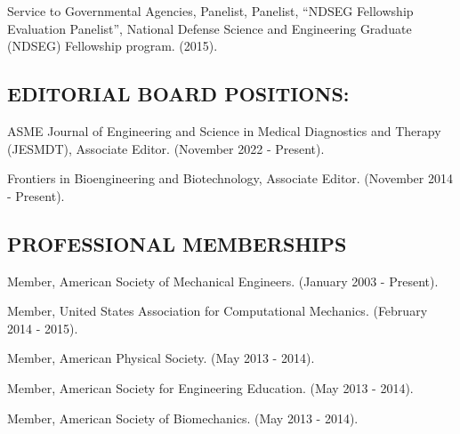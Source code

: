 \documentclass[11pt]{article}
\begin{document}
Service to Governmental Agencies, Panelist, Panelist, ``NDSEG
Fellowship Evaluation Panelist'', National Defense Science and
Engineering Graduate (NDSEG) Fellowship program. 
(2015).

\subsection{EDITORIAL BOARD POSITIONS:}\label{editorial-board-positions}

ASME Journal of Engineering and Science in Medical Diagnostics and
Therapy (JESMDT), Associate Editor. 
(November 2022 - Present).

Frontiers in Bioengineering and Biotechnology, Associate Editor.
(November 2014 - Present).

\subsection{PROFESSIONAL MEMBERSHIPS}\label{professional-memberships}

Member, American Society of Mechanical Engineers. 
(January 2003 -
Present).

Member, United States Association for Computational Mechanics. 
(February
2014 - 2015).

Member, American Physical Society. 
(May 2013 - 2014).

Member, American Society for Engineering Education. 
(May 2013 - 2014).

Member, American Society of Biomechanics. 
(May 2013 - 2014).
\end{document}
